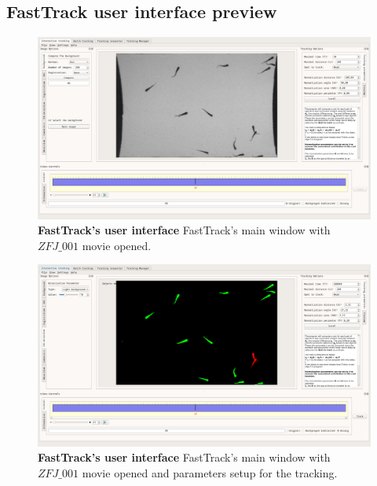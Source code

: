     \begin{appendices}

    \chapter{FastTrack user interface preview}
        \begin{figure}[h!]
        \centering
        \includegraphics[width=1\textwidth]{part_1/assets/ft_preview_0.png}
        \caption{\textbf{FastTrack's user interface} FastTrack's main window with $ZFJ\_001$ movie opened.}
        \end{figure}

        \begin{figure}[h!]
        \centering
        \includegraphics[width=1\textwidth]{part_1/assets/ft_preview_1.png}
        \caption{\textbf{FastTrack's user interface} FastTrack's main window with $ZFJ\_001$ movie opened and parameters setup for the tracking.}
        \end{figure}


\end{appendices}
